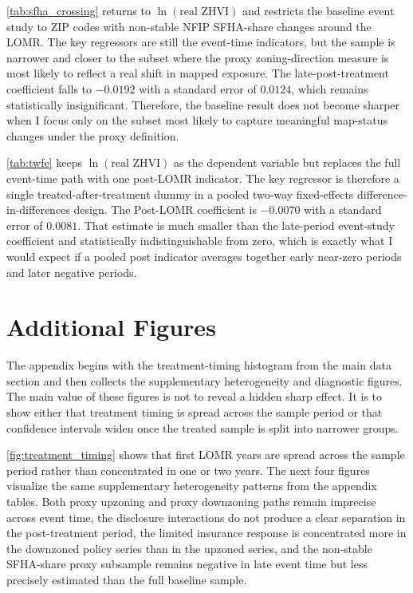 \documentclass[12pt]{article}
\begin{document}


\autoref{tab:sfha_crossing} returns to $\ln(\text{real ZHVI})$ and restricts the baseline event study to ZIP codes with non-stable NFIP SFHA-share changes around the LOMR. The key regressors are still the event-time indicators, but the sample is narrower and closer to the subset where the proxy zoning-direction measure is most likely to reflect a real shift in mapped exposure. The late-post-treatment coefficient falls to $-0.0192$ with a standard error of $0.0124$, which remains statistically insignificant. Therefore, the baseline result does not become sharper when I focus only on the subset most likely to capture meaningful map-status changes under the proxy definition.



\autoref{tab:twfe} keeps $\ln(\text{real ZHVI})$ as the dependent variable but replaces the full event-time path with one post-LOMR indicator. The key regressor is therefore a single treated-after-treatment dummy in a pooled two-way fixed-effects difference-in-differences design. The Post-LOMR coefficient is $-0.0070$ with a standard error of $0.0081$. That estimate is much smaller than the late-period event-study coefficient and statistically indistinguishable from zero, which is exactly what I would expect if a pooled post indicator averages together early near-zero periods and later negative periods.




\section{Additional Figures}\label{app:figures}

The appendix begins with the treatment-timing histogram from the main data section and then collects the supplementary heterogeneity and diagnostic figures. The main value of these figures is not to reveal a hidden sharp effect. It is to show either that treatment timing is spread across the sample period or that confidence intervals widen once the treated sample is split into narrower groups.

\autoref{fig:treatment_timing} shows that first LOMR years are spread across the sample period rather than concentrated in one or two years. The next four figures visualize the same supplementary heterogeneity patterns from the appendix tables. Both proxy upzoning and proxy downzoning paths remain imprecise across event time, the disclosure interactions do not produce a clear separation in the post-treatment period, the limited insurance response is concentrated more in the downzoned policy series than in the upzoned series, and the non-stable SFHA-share proxy subsample remains negative in late event time but less precisely estimated than the full baseline sample.
\end{document}
